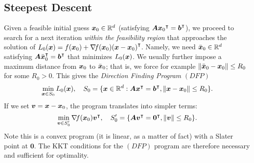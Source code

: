 \subsection{Steepest Descent}
Given a feasible initial guess $\boldsymbol{x}_0 \in \mathbb{R}^d$ (satisfying $\boldsymbol{A}{\boldsymbol{x}_0}^\intercal={\boldsymbol{b}}^\intercal$), we proceed to search for a next iteration \emph{within the feasibility region} that approaches the solution of $L_0(\boldsymbol{x}) = f(\boldsymbol{x}_0) + \mathop{\nabla\! {f}}(\boldsymbol{x}_0){(\boldsymbol{x}-\boldsymbol{x}_0)}^\intercal$.   Namely, we need $\bar{\boldsymbol{x}}_0 \in \mathbb{R}^d$ satisfying $\boldsymbol{A}{\bar{\boldsymbol{x}}_0}^\intercal={\boldsymbol{b}}^\intercal$ that minimizes $L_0(\boldsymbol{x})$.  We usually further impose a maximum distance from $\boldsymbol{x}_0$ to $\bar{\boldsymbol{x}}_0$; that is, we force for example $\lVert \bar{\boldsymbol{x}}_0 - \boldsymbol{x}_0 \rVert \leq R_0$ for some $R_0>0$.  This gives the \emph{Direction Finding Program} $(DFP)$
\begin{equation*}
\min_{\boldsymbol{x} \in S_0}L_0(\boldsymbol{x}), \quad S_0=\{ \boldsymbol{x} \in \mathbb{R}^d :  \boldsymbol{A}{\boldsymbol{x}}^\intercal={\boldsymbol{b}}^\intercal, \lVert \boldsymbol{x}-\boldsymbol{x}_0 \rVert \leq R_0 \}.
\end{equation*}
If we set $\boldsymbol{v} = \boldsymbol{x} - \boldsymbol{x}_0$, the program translates into simpler terms:
\begin{equation*}
\min_{\boldsymbol{v} \in S_0'} \mathop{\nabla\! {f}}(\boldsymbol{x}_0){\boldsymbol{v}}^\intercal, \quad S_0' = \{ \boldsymbol{A}{\boldsymbol{v}}^\intercal = {\boldsymbol{0}}^\intercal, \lVert \boldsymbol{v} \rVert \leq R_0 \}.
\end{equation*}
Note this is a convex program (it is linear, as a matter of fact) with a Slater point at $\boldsymbol{0}$.  The KKT conditions for the $(DFP)$ program are therefore necessary and sufficient for optimality. 

